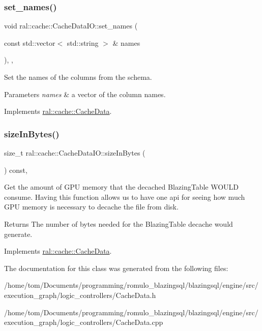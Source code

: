 \subsubsection{\texorpdfstring{set\+\_\+names()}{set\_names()}}
{\footnotesize\ttfamily void ral\+::cache\+::\+Cache\+Data\+I\+O\+::set\+\_\+names (\begin{DoxyParamCaption}\item[{const std\+::vector$<$ std\+::string $>$ \&}]{names }\end{DoxyParamCaption})\hspace{0.3cm}{\ttfamily [inline]}, {\ttfamily [override]}, {\ttfamily [virtual]}}

Set the names of the columns from the schema. 
\begin{DoxyParams}{Parameters}
{\em names} & a vector of the column names. \\
\hline
\end{DoxyParams}


Implements \hyperlink{classral_1_1cache_1_1CacheData_a3bb1623a4266ba7c961d325023ff13c6}{ral\+::cache\+::\+Cache\+Data}.

\mbox{\label{classral_1_1cache_1_1CacheDataIO_a3364dc1069ceba37e2ffc97e5a4508aa}} 
\subsubsection{\texorpdfstring{size\+In\+Bytes()}{sizeInBytes()}}
{\footnotesize\ttfamily size\+\_\+t ral\+::cache\+::\+Cache\+Data\+I\+O\+::size\+In\+Bytes (\begin{DoxyParamCaption}{ }\end{DoxyParamCaption}) const\hspace{0.3cm}{\ttfamily [override]}, {\ttfamily [virtual]}}

Get the amount of G\+PU memory that the decached Blazing\+Table W\+O\+U\+LD consume. Having this function allows us to have one api for seeing how much G\+PU memory is necessary to decache the file from disk. \begin{DoxyReturn}{Returns}
The number of bytes needed for the Blazing\+Table decache would generate. 
\end{DoxyReturn}


Implements \hyperlink{classral_1_1cache_1_1CacheData_aaad8a726296574845f01f9380dcee40d}{ral\+::cache\+::\+Cache\+Data}.



The documentation for this class was generated from the following files\+:\begin{DoxyCompactItemize}
\item 
/home/tom/\+Documents/programming/romulo\+\_\+blazingsql/blazingsql/engine/src/execution\+\_\+graph/logic\+\_\+controllers/Cache\+Data.\+h\item 
/home/tom/\+Documents/programming/romulo\+\_\+blazingsql/blazingsql/engine/src/execution\+\_\+graph/logic\+\_\+controllers/Cache\+Data.\+cpp\end{DoxyCompactItemize}
